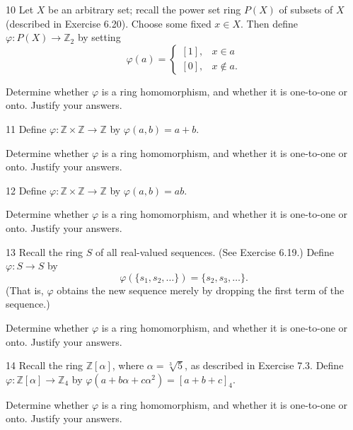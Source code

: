 \begin{problem}{10}
    Let $X$ be an arbitrary set; recall the power set ring $P(X)$ of subsets of $X$ (described in Exercise 6.20). Choose some fixed $x \in X$. Then define $\varphi : P(X) \to \mathbb{Z}_2$ by setting
    \[\varphi(a) = \begin{cases} [1], & x \in a \\ [0], & x \notin a. \end{cases}\]

    Determine whether $\varphi$ is a ring homomorphism, and whether it is
    one-to-one or onto. Justify your answers.
\end{problem}
\unsolved

\begin{problem}{11}
    Define $\varphi : \mathbb{Z} \times \mathbb{Z} \to \mathbb{Z}$ by $\varphi(a, b) = a + b$.

    Determine whether $\varphi$ is a ring homomorphism, and whether it is
    one-to-one or onto. Justify your answers.
\end{problem}
\unsolved

\begin{problem}{12}
    Define $\varphi : \mathbb{Z} \times \mathbb{Z} \to \mathbb{Z}$ by $\varphi(a, b) = ab$.

    Determine whether $\varphi$ is a ring homomorphism, and whether it is
    one-to-one or onto. Justify your answers.
\end{problem}
\unsolved

\begin{problem}{13}
    Recall the ring $S$ of all real-valued sequences. (See Exercise 6.19.) Define $\varphi : S \to S$ by
    \[\varphi(\{s_1, s_2, \ldots\}) = \{s_2, s_3, \ldots\}.\]
    (That is, $\varphi$ obtains the new sequence merely by dropping the first term of the sequence.)

    Determine whether $\varphi$ is a ring homomorphism, and whether it is
    one-to-one or onto. Justify your answers.
\end{problem}
\unsolved

\begin{problem}{14}
    Recall the ring $\mathbb{Z}[\alpha]$, where $\alpha = \sqrt[3]{5}$, as described in Exercise 7.3. Define $\varphi : \mathbb{Z}[\alpha] \to \mathbb{Z}_4$ by $\varphi(a + b\alpha + c\alpha^2) = [a + b + c]_4$.

    Determine whether $\varphi$ is a ring homomorphism, and whether it is
    one-to-one or onto. Justify your answers.
\end{problem}
\unsolved

